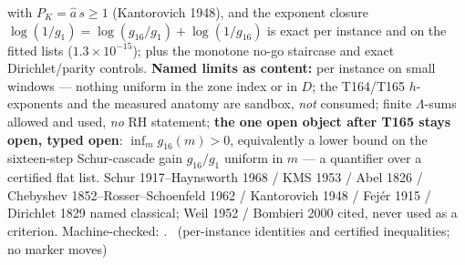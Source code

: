 with $P_K=\hat a\,s\ge1$ (Kantorovich 1948), and the exponent closure
$\log(1/g_1)=\log(g_{16}/g_1)+\log(1/g_{16})$ is exact per instance and
on the fitted lists ($1.3\times10^{-15}$); plus the monotone no-go
staircase and exact Dirichlet/parity controls.
\textbf{Named limits as content:} per instance on small windows ---
nothing uniform in the zone index or in $D$; the T164/T165 $h$-exponents
and the measured anatomy are sandbox, \emph{not} consumed; finite
$\Lambda$-sums allowed and used, \emph{no} RH statement; \textbf{the one
open object after T165 stays open, typed open}: $\inf_m g_{16}(m)>0$,
equivalently a lower bound on the sixteen-step Schur-cascade gain
$g_{16}/g_1$ uniform in $m$ --- a quantifier over a certified flat list.
Schur 1917--Haynsworth 1968 / KMS 1953 / Abel 1826 / Chebyshev
1852--Rosser--Schoenfeld 1962 / Kantorovich 1948 / Fej\'er 1915 /
Dirichlet 1829 named classical; Weil 1952 / Bombieri 2000 cited, never
used as a criterion.
Machine-checked:
.
\mE\ (per-instance identities and certified inequalities; no marker moves)


